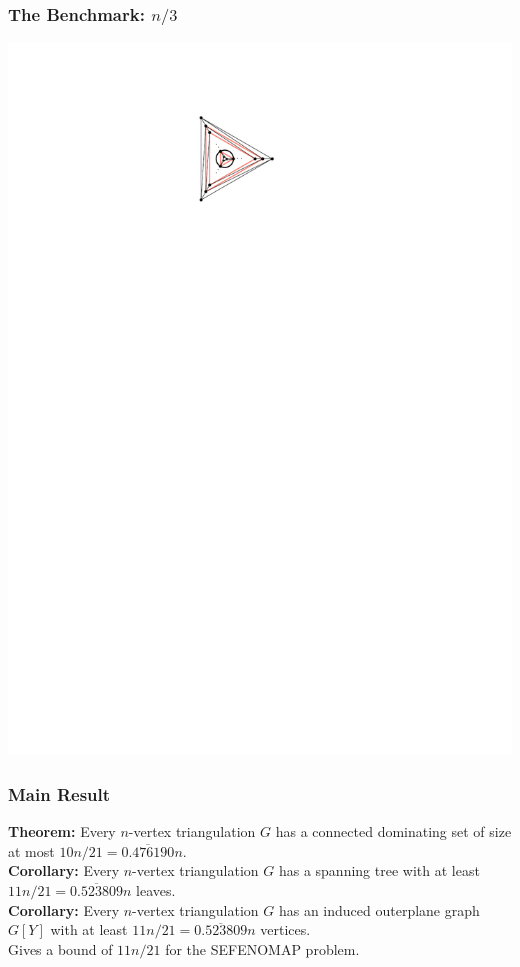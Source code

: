 \documentclass{beamer}
\begin{document}
\begin{frame}
  \frametitle{The Benchmark: $n/3$}

  \begin{center}
    \includegraphics[height=.7\textheight]{figs/nover3}
  \end{center}
\end{frame}


\begin{frame}
  \frametitle{Main Result}

  \textbf{Theorem:}  Every $n$-vertex triangulation $G$ has a connected dominating set of size at most $10n/21=\overline{0.476190}n$.\\[2em]

  \textbf{Corollary:}  Every $n$-vertex triangulation $G$ has a spanning tree with at least $11n/21=\overline{0.523809}n$ leaves.\\[2em]

  \textbf{Corollary:}  Every $n$-vertex triangulation $G$ has an induced outerplane graph $G[Y]$ with at least $11n/21=\overline{0.523809}n$ vertices.\\[2em]

  Gives a bound of $11n/21$ for the SEFENOMAP problem.
\end{frame}
\end{document}
